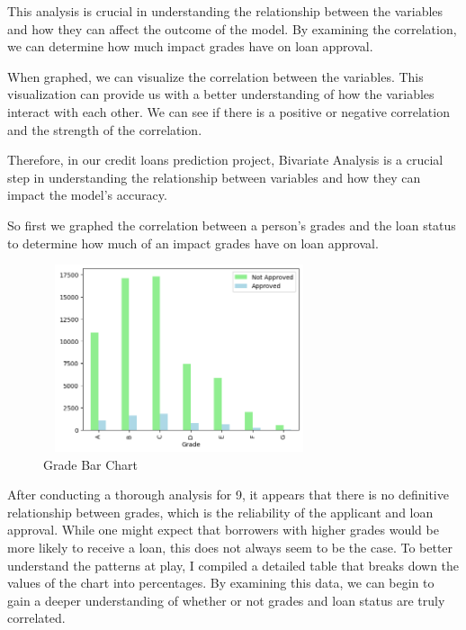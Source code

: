\documentclass[sigplan]{acmart}
\begin{document}
This analysis is crucial in understanding the relationship between the variables and how they can affect the outcome of the model. By examining the correlation, we can determine how much impact grades have on loan approval.

When graphed, we can visualize the correlation between the variables. This visualization can provide us with a better understanding of how the variables interact with each other. We can see if there is a positive or negative correlation and the strength of the correlation.

Therefore, in our credit loans prediction project, Bivariate Analysis is a crucial step in understanding the relationship between variables and how they can impact the model's accuracy.

So first we graphed the correlation between a person's grades and the loan status to determine how much of an impact grades have on loan approval.
\begin{figure}[h]
    \centering
    \includegraphics[width=8cm, height = 5.5cm]{images/grade vs loan status.png}
    \caption{Grade Bar Chart}
\end{figure}

After conducting a thorough analysis for \figurename{ 9}, it appears that there is no definitive relationship between grades, which is the reliability of the applicant and loan approval. While one might expect that borrowers with higher grades would be more likely to receive a loan, this does not always seem to be the case. To better understand the patterns at play, I compiled a detailed table that breaks down the values of the chart into percentages. By examining this data, we can begin to gain a deeper understanding of whether or not grades and loan status are truly correlated.
\end{document}
